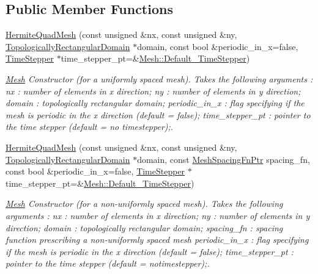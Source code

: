 \subsection*{Public Member Functions}
\begin{DoxyCompactItemize}
\item 
\hyperlink{classoomph_1_1HermiteQuadMesh_aea2e2144668d092f4e358f195bbc74e7}{Hermite\+Quad\+Mesh} (const unsigned \&nx, const unsigned \&ny, \hyperlink{classoomph_1_1TopologicallyRectangularDomain}{Topologically\+Rectangular\+Domain} $\ast$domain, const bool \&periodic\+\_\+in\+\_\+x=false, \hyperlink{classoomph_1_1TimeStepper}{Time\+Stepper} $\ast$time\+\_\+stepper\+\_\+pt=\&\hyperlink{classoomph_1_1Mesh_a12243d0fee2b1fcee729ee5a4777ea10}{Mesh\+::\+Default\+\_\+\+Time\+Stepper})
\begin{DoxyCompactList}\small\item\em \hyperlink{classoomph_1_1Mesh}{Mesh} Constructor (for a uniformly spaced mesh). Takes the following arguments \+: nx \+: number of elements in x direction; ny \+: number of elements in y direction; domain \+: topologically rectangular domain; periodic\+\_\+in\+\_\+x \+: flag specifying if the mesh is periodic in the x direction (default = false); time\+\_\+stepper\+\_\+pt \+: pointer to the time stepper (default = no timestepper);. \end{DoxyCompactList}\item 
\hyperlink{classoomph_1_1HermiteQuadMesh_ae28d471336aebafc5fe5e9f303ab0ad8}{Hermite\+Quad\+Mesh} (const unsigned \&nx, const unsigned \&ny, \hyperlink{classoomph_1_1TopologicallyRectangularDomain}{Topologically\+Rectangular\+Domain} $\ast$domain, const \hyperlink{classoomph_1_1HermiteQuadMesh_abebf4806b300591f976398404ed0ef3f}{Mesh\+Spacing\+Fn\+Ptr} spacing\+\_\+fn, const bool \&periodic\+\_\+in\+\_\+x=false, \hyperlink{classoomph_1_1TimeStepper}{Time\+Stepper} $\ast$time\+\_\+stepper\+\_\+pt=\&\hyperlink{classoomph_1_1Mesh_a12243d0fee2b1fcee729ee5a4777ea10}{Mesh\+::\+Default\+\_\+\+Time\+Stepper})
\begin{DoxyCompactList}\small\item\em \hyperlink{classoomph_1_1Mesh}{Mesh} Constructor (for a non-\/uniformly spaced mesh). Takes the following arguments \+: nx \+: number of elements in x direction; ny \+: number of elements in y direction; domain \+: topologically rectangular domain; spacing\+\_\+fn \+: spacing function prescribing a non-\/uniformly spaced mesh periodic\+\_\+in\+\_\+x \+: flag specifying if the mesh is periodic in the x direction (default = false); time\+\_\+stepper\+\_\+pt \+: pointer to the time stepper (default = notimestepper);. \end{DoxyCompactList}\item 

\end{DoxyCompactItemize}
